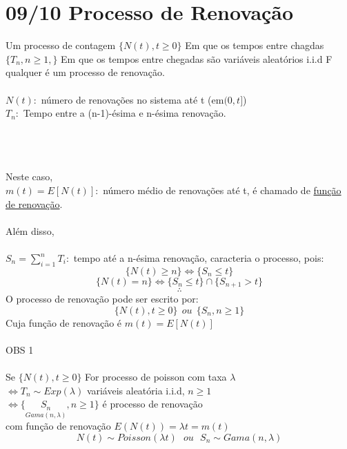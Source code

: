 \documentclass[a4paper,12pt]{article}
\begin{document}
       \section*{09/10 Processo de Renovação} 
       Um processo de contagem     $\{N(t),t\ge0\}$  Em que os tempos entre chagdas $\{ T_n,n\ge 1,\}$ Em que os tempos entre chegadas são variáveis aleatórios i.i.d F qualquer é um processo de renovação.\\
       \\
       $N(t):$ número de renovações no sistema até t (em$(0,t]$)\\
       $T_n:$ Tempo entre a (n-1)-ésima e n-ésima renovação.\\
       \\
       \\
       \\
       Neste caso,\\
       $m(t)=E[N(t)]:$ número médio de renovações até t, é chamado de \underline{função de renovação}.\\
       \\
       Além disso,\\
       \\
       $S_n=\sum\limits_{i=1}^{n}T_i:$ tempo até a n-ésima renovação, caracteria o processo, pois:
       $$\{N(t)\ge n\}\iff \{S_n\le t\} $$
       $$\{N(t)=n\}\iff \{S_n\le t\}\cap \{S_{n+1}>t\} $$
       $$\therefore $$
       O processo de renovação pode ser escrito por:
       $$\{N(t),t\ge 0\}  \ \ ou \ \ \{S_n,n\ge 1 \}$$
       Cuja função de renovação é $m(t)=E[N(t)]$\\
       \\
       OBS  1 \\
       \\
       Se  $\{N(t),t\ge0\}$ For processo de poisson com taxa $\lambda$\\  $\iff T_n\sim Exp(\lambda) $ variáveis aleatória i.i.d, $n\ge1$\\
       $ \iff \{ \underset{Gama(n,\lambda)}{S_n},n\ge 1\}$ é processo de renovação\\ com função de renovação $ E(N(t))=\lambda t =m(t)$
       $$N(t)\sim Poisson(\lambda t) \ \ \ ou \ \ \ S_n\sim Gama(n,\lambda)$$
      \newpage
\end{document}
